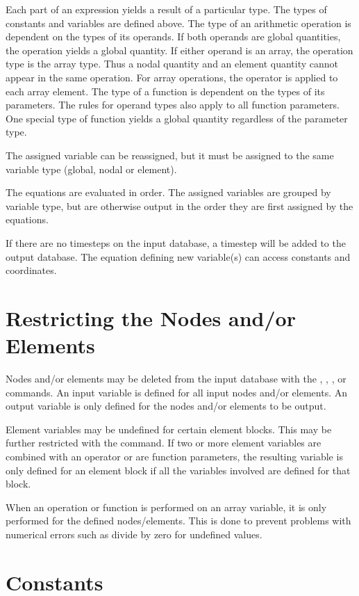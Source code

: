 Each part of an expression yields a result of a particular type. The
types of constants and variables are defined above. The type of an
arithmetic operation is dependent on the types of its operands. If both
operands are global quantities, the operation yields a global
quantity. If either operand is an array, the operation type is
the array type. Thus a nodal quantity and an element quantity cannot
appear in the same operation. For array operations, the operator is
applied to each array element. The type of a function is dependent on
the types of its parameters. The rules for operand types also apply to
all function parameters. One special type of function yields a global
quantity regardless of the parameter type.

The assigned variable can be reassigned, but it must be assigned to the
same variable type (global, nodal or element).

The equations are evaluated in order. The assigned variables are grouped
by variable type, but are otherwise output in the order they are first
assigned by the equations.

If there are no timesteps on the input database, a timestep will be
added to the output database. The equation defining new variable(s)
can access constants and coordinates.

\section{Restricting the Nodes and/or Elements}

Nodes and/or elements may be deleted from the input database with the
, , , or  commands. An
input variable is defined for all input nodes and/or elements. An
output variable is only defined for the nodes and/or elements to be
output.

Element variables may be undefined for certain element blocks. This may
be further restricted with the  command. If two or more
element variables are combined with an operator or are function
parameters, the resulting variable is only defined for an element block
if all the variables involved are defined for that block.

When an operation or function is performed on an array variable, it is
only performed for the defined nodes/elements. This is done to prevent
problems with numerical errors such as divide by zero for undefined
values.

\section{Constants}

